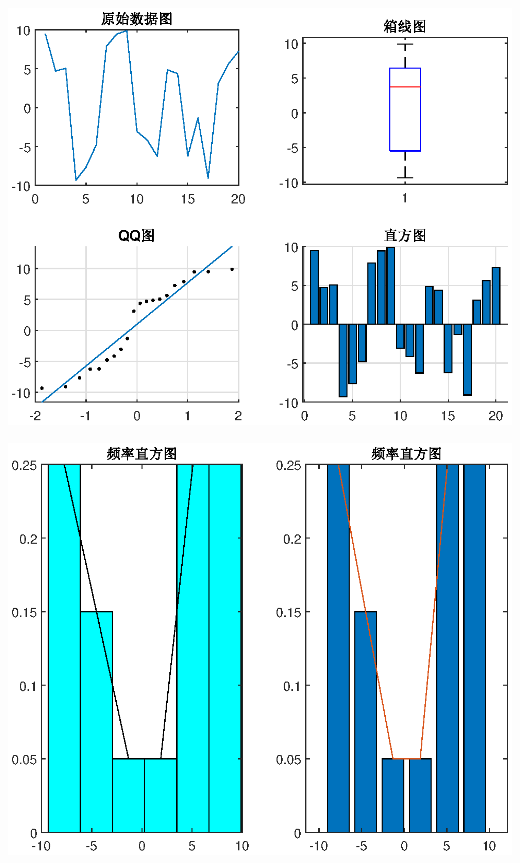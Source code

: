 \documentclass{hfutpaper}
\makeatletter
\newcommand{\figcaption}{\def\@captype{figure}\caption}
\makeatother
\begin{document}
\begin{center}
	\includegraphics{figure/fourSF.eps}
	\figcaption{四种统计图}
	\includegraphics{figure/freBar.eps}
	\figcaption{两张频率直方图(使用不同的方法)}
\end{center}
\end{document}
